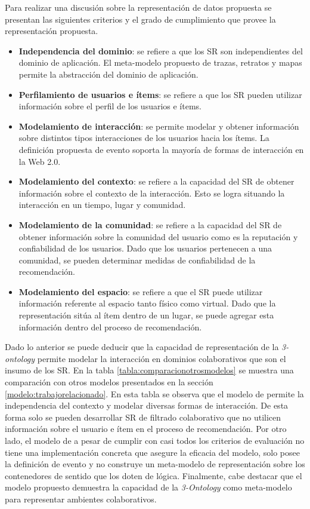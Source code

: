 Para realizar una discusión sobre la representación de datos propuesta se presentan las siguientes criterios y el grado de cumplimiento que provee la representación propuesta.
\begin{itemize}
	\item \textbf{Independencia del dominio}: se refiere a que los SR son independientes del dominio de aplicación. El meta-modelo propuesto de trazas, retratos y mapas permite la abstracción del dominio de aplicación.
	\item \textbf{Perfilamiento de usuarios e ítems}: se refiere a que los SR pueden utilizar información sobre el perfil de los usuarios e ítems.
	\item \textbf{Modelamiento de interacción}: se permite modelar y obtener información sobre distintos tipos interacciones de los usuarios hacia los ítems. La definición propuesta de evento soporta la mayoría de formas de interacción en la Web 2.0.
	\item\textbf{Modelamiento del contexto}: se refiere a la capacidad del SR de obtener información sobre el contexto de la interacción. Esto se logra  situando la interacción en un tiempo, lugar y comunidad.
	\item \textbf{Modelamiento de la comunidad}: se refiere a la capacidad del SR de obtener información sobre la comunidad del usuario como es la reputación y confiabilidad de los usuarios. Dado que los usuarios pertenecen a una comunidad, se pueden determinar medidas de confiabilidad de la recomendación.
	\item \textbf{Modelamiento del espacio}: se refiere a que el SR puede utilizar información referente al espacio tanto físico como virtual. Dado que la representación sitúa al ítem dentro de un lugar, se puede agregar esta información dentro del proceso de recomendación.
\end{itemize}

Dado lo anterior se puede deducir que la capacidad de representación de la \textit{3-ontology} permite modelar la interacción en dominios colaborativos que son el insumo de los SR. En la tabla \ref{tabla:comparacionotrosmodelos} se muestra una comparación con otros modelos presentados en la sección \ref{modelo:trabajorelacionado}. En esta tabla se observa que el modelo de \cite{Babar:2010} permite la independencia del contexto y modelar diversas formas de interacción. De esta forma solo se pueden desarrollar SR de filtrado colaborativo que no utilicen información sobre el usuario e ítem en el proceso de recomendación. Por otro lado, el modelo de \cite{Palomino:2012} a pesar de cumplir con casi todos los criterios de evaluación no tiene una implementación concreta que asegure la eficacia del modelo, solo posee la definición de evento y no construye un meta-modelo de representación sobre los contenedores de sentido que los doten de lógica. Finalmente, cabe destacar que el modelo propuesto demuestra la capacidad de la \textit{3-Ontology} como meta-modelo para representar ambientes colaborativos.

